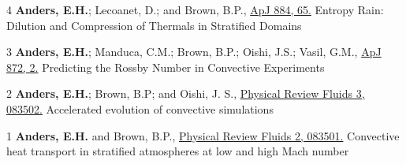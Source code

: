 	  {4}
	  {
		  \textbf{Anders, E.H.}; Lecoanet, D.; and Brown, B.P., 
		  \href{https://iopscience.iop.org/article/10.3847/1538-4357/ab3644}{ApJ 884, 65.}
	  }
	  {Entropy Rain: Dilution and Compression of Thermals in Stratified Domains}

\cvpub{}
	  {3}
	  {
		  \textbf{Anders, E.H.}; Manduca, C.M.; Brown, B.P.; Oishi, J.S.; Vasil, G.M., 
		  \href{https://iopscience.iop.org/article/10.3847/1538-4357/aaff61}{ApJ 872, 2.}
	  }
	  {Predicting the Rossby Number in Convective Experiments}

	  {2}
	  {
		  \textbf{Anders, E.H.}; Brown, B.P; and Oishi, J. S.,
		  \href{https://journals.aps.org/prfluids/abstract/10.1103/PhysRevFluids.3.083502}{Physical Review Fluids 3, 083502.}
	  }
	  {Accelerated evolution of convective simulations}

	  {1}
	  {
		  \textbf{Anders, E.H.} and Brown, B.P.,
		  \href{https://journals.aps.org/prfluids/abstract/10.1103/PhysRevFluids.2.083501}{Physical Review Fluids 2, 083501.}
	  }
	  {Convective heat transport in stratified atmospheres at low and high Mach number}
